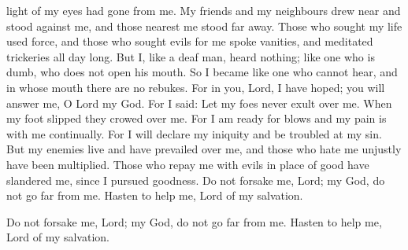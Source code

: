 \documentclass{article}
\begin{document}
\begin{service}
\begin{multicols}{2}
{			light of my eyes had gone from me. My friends and my neighbours drew near and
			stood against me, and those nearest me stood far away. Those who sought my life
			used force, and those who sought evils for me spoke vanities, and meditated
			trickeries all day long. But I, like a deaf man, heard nothing; like one who is
			dumb, who does not open his mouth. So I became like one who cannot hear, and in
			whose mouth there are no rebukes. For in you, Lord, I have hoped; you will
			answer me, O Lord my God. For I  said: Let my foes never exult over me.
			When my foot slipped they crowed over me. For I am ready for blows and my pain
			is with me continually. For I will declare my iniquity and be troubled at my sin.
			But my enemies live and have prevailed over me, and those who hate me unjustly
			have been multiplied. Those who repay me with evils in place of good have
			slandered me, since I pursued goodness. Do not forsake me, Lord; my God, do not
			go far from me. Hasten to help me, Lord of my salvation.
			\andagain
			\item Do not forsake me, Lord; my God, do not go far from me. Hasten to help me,
			Lord of my salvation.
		}
		\rest
\end{multicols}
\end{service}
\end{document}
